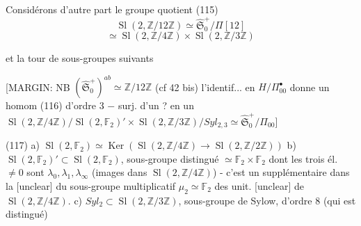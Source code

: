 Considérons d'autre part le groupe quotient
(115) $$\operatorname{Sl}(2, \mathbb{Z}/12\mathbb{Z}) \simeq \hat{\mathfrak{S}}_0^+ / \Pi[12]$$
$$ \simeq \operatorname{Sl}(2, \mathbb{Z}/4\mathbb{Z}) \times \operatorname{Sl}(2, \mathbb{Z}/3\mathbb{Z}) $$

et la tour de sous-groupes suivants

[MARGIN: NB $(\hat{\mathfrak{S}}_0^+)^{ab} \simeq \mathbb{Z}/12\mathbb{Z}$ (cf 42 bis)
l'identif... en $H/\Pi_{00}^\bullet$ donne un homom (116)
d'ordre 3 $-$ surj. d'un ? en un
$\operatorname{Sl}(2, \mathbb{Z}/4\mathbb{Z}) / \operatorname{Sl}(2, \mathbb{F}_2)' \times \operatorname{Sl}(2, \mathbb{Z}/3\mathbb{Z}) / Syl_{2,3} \simeq \hat{\mathfrak{S}}_0^+ / \Pi_{00}$]


(117)
a) $\operatorname{Sl}(2, \mathbb{F}_2) \simeq \operatorname{Ker}(\operatorname{Sl}(2, \mathbb{Z}/4\mathbb{Z}) \to \operatorname{Sl}(2, \mathbb{Z}/2\mathbb{Z}))$
b) $\operatorname{Sl}(2, \mathbb{F}_2)' \subset \operatorname{Sl}(2, \mathbb{F}_2)$, sous-groupe distingué $\simeq \mathbb{F}_2 \times \mathbb{F}_2$ dont les trois él. $\neq 0$ sont $\lambda_0, \lambda_1, \lambda_\infty$ (images dans $\operatorname{Sl}(2, \mathbb{Z}/4\mathbb{Z})$) - c'est un supplémentaire dans la [unclear] du sous-groupe multiplicatif $\mu_2 \simeq \mathbb{F}_2$ des unit. [unclear] de $\operatorname{Sl}(2, \mathbb{Z}/4\mathbb{Z})$.
c) $Syl_2 \subset \operatorname{Sl}(2, \mathbb{Z}/3\mathbb{Z})$, sous-groupe de Sylow, d'ordre 8 (qui est distingué)

\newpage

